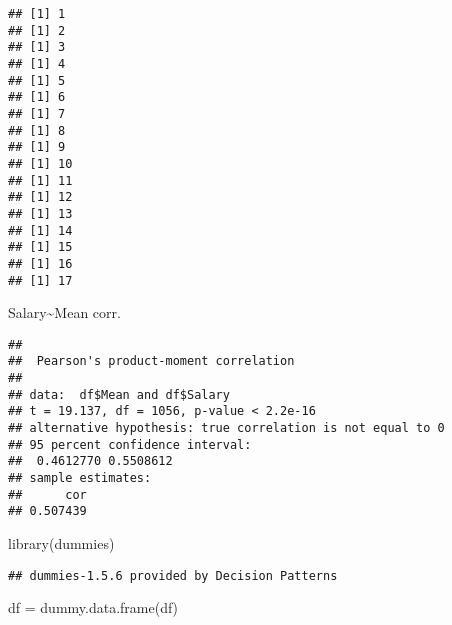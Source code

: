 \documentclass[
]{article}
\newenvironment{Shaded}{\begin{snugshade}}{\end{snugshade}}
\newcommand{\AttributeTok}[1]{\textcolor[rgb]{0.77,0.63,0.00}{#1}}
\newcommand{\DecValTok}[1]{\textcolor[rgb]{0.00,0.00,0.81}{#1}}
\newcommand{\FunctionTok}[1]{\textcolor[rgb]{0.00,0.00,0.00}{#1}}
\newcommand{\NormalTok}[1]{#1}
\newcommand{\OtherTok}[1]{\textcolor[rgb]{0.56,0.35,0.01}{#1}}
\newcommand{\SpecialCharTok}[1]{\textcolor[rgb]{0.00,0.00,0.00}{#1}}
\newcommand{\StringTok}[1]{\textcolor[rgb]{0.31,0.60,0.02}{#1}}
\begin{document}
\begin{verbatim}
## [1] 1
## [1] 2
## [1] 3
## [1] 4
## [1] 5
## [1] 6
## [1] 7
## [1] 8
## [1] 9
## [1] 10
## [1] 11
## [1] 12
## [1] 13
## [1] 14
## [1] 15
## [1] 16
## [1] 17
\end{verbatim}

\begin{Shaded}
\end{Shaded}

Salary\textasciitilde Mean corr.

\begin{Shaded}
\end{Shaded}

\begin{verbatim}
## 
##  Pearson's product-moment correlation
## 
## data:  df$Mean and df$Salary
## t = 19.137, df = 1056, p-value < 2.2e-16
## alternative hypothesis: true correlation is not equal to 0
## 95 percent confidence interval:
##  0.4612770 0.5508612
## sample estimates:
##      cor 
## 0.507439
\end{verbatim}

\begin{Shaded}
\begin{Highlighting}[]
\FunctionTok{library}\NormalTok{(dummies)}
\end{Highlighting}
\end{Shaded}

\begin{verbatim}
## dummies-1.5.6 provided by Decision Patterns
\end{verbatim}

\begin{Shaded}
\begin{Highlighting}[]
\NormalTok{df }\OtherTok{=} \FunctionTok{dummy.data.frame}\NormalTok{(df)}
\end{Highlighting}
\end{Shaded}
\end{document}

